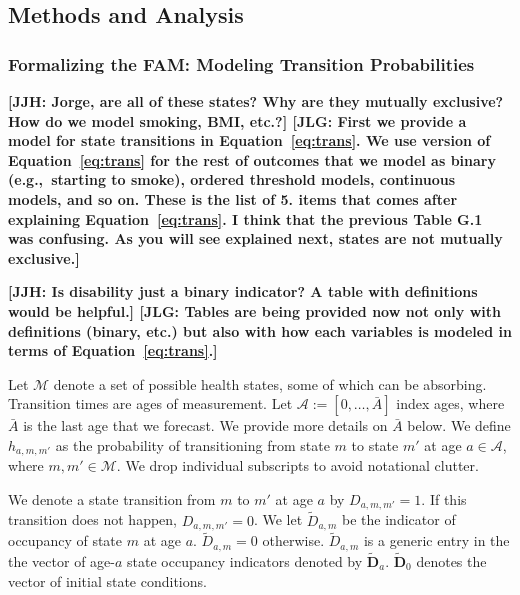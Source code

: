\subsection{Methods and Analysis}

\subsubsection{Formalizing the FAM: Modeling Transition Probabilities}
\label{section:transition_models}



\textbf{[JJH: Jorge, are all of these states? Why are they mutually exclusive? How do we model smoking, BMI, etc.?] [JLG: First we provide a model for state transitions in Equation~\ref{eq:trans}. We use version of Equation~\ref{eq:trans} for the rest of outcomes that we model as binary (e.g.,\ starting to smoke), ordered threshold models, continuous models, and so on. These is the list of 5. items that comes after explaining Equation~\ref{eq:trans}. I think that the previous Table G.1 was confusing. As you will see explained next, states are not mutually exclusive.]}

\textbf{[JJH: Is disability just a binary indicator? A table with definitions would be helpful.] [JLG: Tables are being provided now not only with definitions (binary, etc.) but also with how each variables is modeled in terms of Equation~\eqref{eq:trans}.]}

Let $\mathcal{M}$ denote a set of possible health states, some of which can be absorbing. Transition times are ages of measurement. Let $\mathcal{A}:= [ 0, \ldots, \bar{A}]$ index ages, where $\bar{A}$ is the last age that we forecast. We provide more details on $\bar{A}$ below. We define $h_{a,m,m'}$ as the probability of transitioning from state $m$ to state $m'$ at age $a \in \mathcal{A}$, where $m, m' \in \mathcal{M}$. We drop individual subscripts to avoid notational clutter.

We denote a state transition from $m$ to $m'$ at age $a$ by $D_{a,m,m'} = 1$. If this transition does not happen,  $D_{a,m,m'} = 0$. We let $\tilde{D}_{a,m}$ be the indicator of occupancy of state $m$ at age $a$. $\tilde{D}_{a,m} = 0$ otherwise. $\tilde{D}_{a,m}$ is a generic entry in the the vector of age-$a$ state occupancy indicators denoted by $\tilde{\bm{D}}_a$. $\tilde{\bm{D}}_0$ denotes the vector of initial state conditions.

